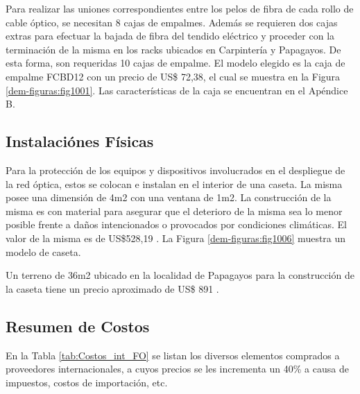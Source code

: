Para realizar las uniones correspondientes entre los pelos de fibra de  cada rollo de cable óptico, se necesitan 8 cajas de empalmes. Además se requieren dos cajas  extras para efectuar la bajada de fibra del tendido eléctrico y proceder con la terminación de la misma en los racks ubicados en Carpintería y Papagayos. De esta forma, son requeridas 10 cajas de empalme.
El modelo elegido es la caja de empalme FCBD12 con un precio de US\$ 72,38, el cual se muestra en la Figura \ref{dem-figuras:fig1001}. Las características de la caja se encuentran en el Apéndice B.


\subsection{Instalaciónes Físicas}


Para la protección de los equipos y dispositivos involucrados en el despliegue de la red óptica, estos se colocan e instalan en el interior de una caseta. La misma posee una dimensión de 4m2 con una ventana de 1m2. La construcción de la misma es con material para asegurar que el deterioro de la misma sea lo menor posible frente a daños intencionados o provocados por condiciones climáticas. El valor de la misma es de US\$528,19 \cite{modplant3}. La Figura \ref{dem-figuras:fig1006} muestra un modelo de caseta.




Un terreno de 36m2 ubicado en la localidad de Papagayos para la construcción de la caseta tiene un precio aproximado de US\$ 891 \cite{terreno1duplicado} \cite{terreno2duplicado} \cite{terreno3duplicado}.

\subsection{Resumen de Costos}

En la Tabla \ref{tab:Costos_int_FO} se listan los diversos elementos comprados a proveedores internacionales, a cuyos precios se les incrementa un 40\% a causa de impuestos, costos de importación, etc.

